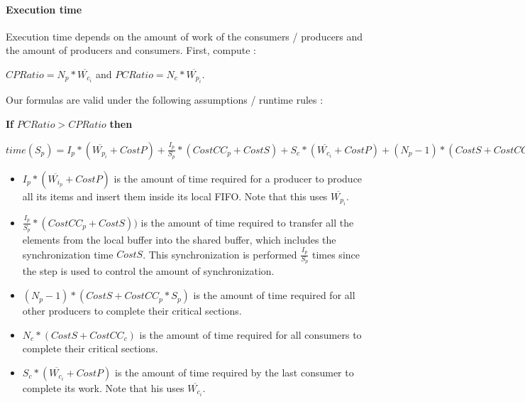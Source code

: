 \documentclass[a4paper,11pt]{article}
\begin{document}
\paragraph{Execution time}
Execution time depends on the amount of work of the consumers / producers and the amount of producers and consumers. First, compute : 
\medskip

    $ CPRatio = N_p * \overline{W_{c_i}} $ and $ PCRatio = N_c * \overline{W_{p_i}} $.

    \medskip

    Our formulas are valid under the following assumptions / runtime rules : 

    \begin{center}
    \end{center}

        \medskip
\noindent \textbf{If} $ PCRatio > CPRatio $ \textbf{then}

    $ time(S_p) = I_p * (\overline{W_{p_i}} + CostP) + \frac{I_p}{S_p} * (CostCC_p + CostS) + S_c * (\overline{W_{c_i}} + CostP) + (N_p - 1) * (CostS + CostCC_p * S_p) + N_c * (CostS + CostCC_c) $

    \begin{itemize}
        \item $ I_p * (\overline{W_{i_p}} + CostP) $ is the amount of time required for a producer to produce all its items and insert them inside its local FIFO. Note that this uses $ \overline{W_{p_i}} $.
        \item $ \frac{I_p}{S_p} * (CostCC_p + CostS)) $ is the amount of time required to transfer all the elements from the local buffer into the shared buffer, which includes the synchronization time $ CostS $. This synchronization is performed $ \frac{I_p}{S_p} $ times since the step is used to control the amount of synchronization.
        \item $ (N_p - 1) * (CostS + CostCC_p * S_p) $ is the amount of time required for all other producers to complete their critical sections.
        \item $ N_c * (CostS + CostCC_c) $ is the amount of time required for all consumers to complete their critical sections.
        \item $ S_c * (\overline{W_{c_i}} + CostP) $ is the amount of time required by the last consumer to complete its work. Note that his uses $ \overline{W_{c_i}} $.
    \end{itemize}
\end{document}
